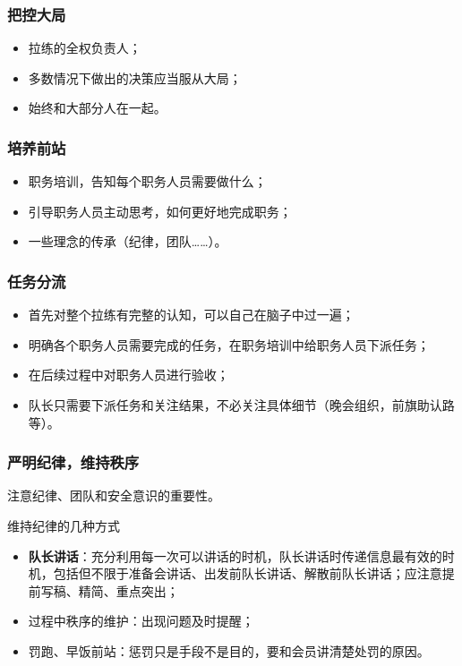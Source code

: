 \documentclass[UTF8]{ctexart}
\begin{document}
\subsubsection{把控大局}
\begin{itemize}[nosep,left=2em]
    \item 拉练的全权负责人；
    \item 多数情况下做出的决策应当服从大局；
    \item 始终和大部分人在一起。
\end{itemize}

\subsubsection{培养前站}
\begin{itemize}[nosep,left=2em]
    \item 职务培训，告知每个职务人员需要做什么；
    \item 引导职务人员主动思考，如何更好地完成职务；
    \item 一些理念的传承（纪律，团队……）。
\end{itemize}

\subsubsection{任务分流}
\begin{itemize}[nosep,left=2em]
    \item 首先对整个拉练有完整的认知，可以自己在脑子中过一遍；
    \item 明确各个职务人员需要完成的任务，在职务培训中给职务人员下派任务；
    \item 在后续过程中对职务人员进行验收；
    \item 队长只需要下派任务和关注结果，不必关注具体细节（晚会组织，前旗助认路等）。
\end{itemize}

\subsubsection{严明纪律，维持秩序}

注意纪律、团队和安全意识的重要性。

维持纪律的几种方式
\begin{itemize}[nosep,left=4em]
    \item \textbf{队长讲话}：充分利用每一次可以讲话的时机，队长讲话时传递信息最有效的时机，包括但不限于准备会讲话、出发前队长讲话、解散前队长讲话；应注意提前写稿、精简、重点突出；
    \item 过程中秩序的维护：出现问题及时提醒；
    \item 罚跑、早饭前站：惩罚只是手段不是目的，要和会员讲清楚处罚的原因。
\end{itemize}
\end{document}
